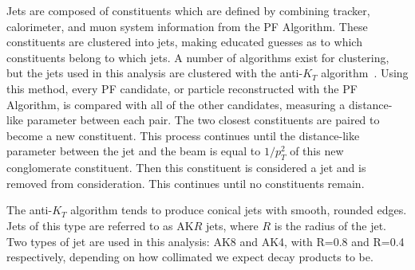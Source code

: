 Jets are composed of constituents which are defined by combining tracker, calorimeter, and muon system information from the PF Algorithm. These constituents are clustered into jets, making educated guesses as to which constituents belong to which jets. A number of algorithms exist for clustering, but the jets used in this analysis are clustered with the anti-$K_{T}$ algorithm~\cite{Cacciari:2008gp}. Using this method, every PF candidate, or particle reconstructed with the PF Algorithm, is compared with all of the other candidates, measuring a distance-like parameter between each pair. The two closest constituents are paired to become a new constituent. This process continues until the distance-like parameter between the jet and the beam is equal to $1/p_T^2$ of this new conglomerate constituent. Then this constituent is considered a jet and is removed from consideration. This continues until no constituents remain.

The anti-$K_{T}$ algorithm tends to produce conical jets with smooth, rounded edges. Jets of this type are referred to as AK$R$ jets, where $R$ is the radius of the jet. Two types of jet are used in this analysis: AK8 and AK4, with R=0.8 and R=0.4 respectively, depending on how collimated we expect decay products to be.


\vspace{5mm}

